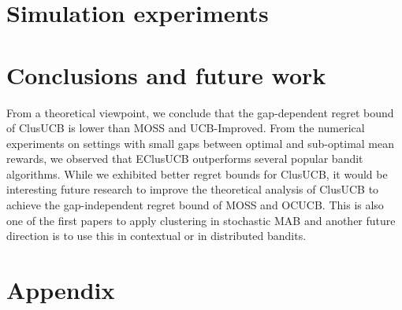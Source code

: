 \documentclass{article}
\begin{document}
\section{Simulation experiments}
\label{sec:expts}
\vspace*{-0.7em}

%
\vspace*{-1.6em}
\section{Conclusions and future work}
\label{sec:conclusions}
\vspace*{-0.7em}
From a theoretical viewpoint, we conclude that the gap-dependent regret bound of ClusUCB is lower than MOSS and UCB-Improved. From the numerical experiments on settings with small gaps between optimal and sub-optimal mean rewards, we observed that EClusUCB outperforms several popular bandit algorithms. 
While we exhibited better regret bounds for ClusUCB, it would be interesting future research to improve the theoretical analysis of ClusUCB to achieve the gap-independent regret bound of MOSS and OCUCB. This is also one of the first papers to apply clustering in stochastic MAB and another future direction is to use this in contextual or in distributed bandits.


\clearpage
\newpage






\clearpage
\newpage
\onecolumn
\section*{Appendix}

\end{document}
